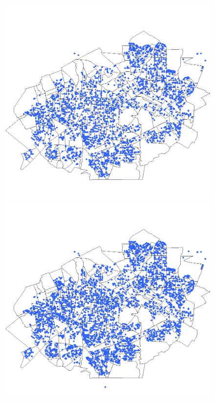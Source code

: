 \begin{figure}[H]
\begin{minipage}{.45\textwidth}
    \captionsetup{labelformat=empty}
  \end{minipage}
  \begin{minipage}{.45\textwidth}
    \centering
    \includegraphics[width=1.0\textwidth]{Figuras/Resultados/Observado/01-09-2009.png}
    \captionsetup{labelformat=empty}
  \end{minipage}%
  \centering
  \begin{minipage}{.45\textwidth}
    \centering
    \includegraphics[width=1.0\textwidth]{Figuras/Resultados/Observado/01-10-2009.png}

\end{minipage}
\end{figure}
